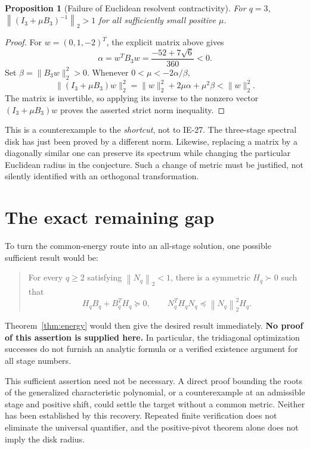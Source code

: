 \documentclass[11pt,letterpaper]{article}
\newtheorem{proposition}[theorem]{Proposition}
\theoremstyle{remark}
\newcommand{\Id}{I}
\newcommand{\norm}[1]{\left\|#1\right\|_2}
\begin{document}
\begin{proposition}[Failure of Euclidean resolvent contractivity]\label{prop:failure}
For \(q=3\), \(\norm{(\Id_3+\mu B_3)^{-1}}>1\) for all sufficiently small
positive \(\mu\).
\end{proposition}
\begin{proof}
For \(w=(0,1,-2)^T\), the explicit matrix above gives
\[
 \alpha=w^TB_3w=\frac{-52+7\sqrt6}{360}<0.
\]
Set \(\beta=\|B_3w\|_2^2>0\). Whenever \(0<\mu<-2\alpha/\beta\),
\[
 \|(\Id_3+\mu B_3)w\|_2^2
 =\|w\|_2^2+2\mu\alpha+\mu^2\beta<\|w\|_2^2.
\]
The matrix is invertible, so applying its inverse to the nonzero vector
\((\Id_3+\mu B_3)w\) proves the asserted strict norm inequality.
\end{proof}

This is a counterexample to the \emph{shortcut}, not to IE-27.
The three-stage spectral disk has just been proved by a different norm.
Likewise, replacing a matrix by a diagonally similar one can preserve its
spectrum while changing the particular Euclidean radius in the conjecture.
Such a change of metric must be justified, not silently identified with
an orthogonal transformation.

\section{The exact remaining gap}

To turn the common-energy route into an all-stage solution, one possible
sufficient result would be:
\begin{quote}
For every \(q\ge2\) satisfying \(\norm{N_q}<1\), there is a symmetric
\(H_q\succ0\) such that
\[
 H_qB_q+B_q^TH_q\succeq0,\qquad
 N_q^TH_qN_q\preceq\norm{N_q}^2H_q.
\]
\end{quote}
Theorem~\ref{thm:energy} would then give the desired result immediately.
\textbf{No proof of this assertion is supplied here.} In particular, the
tridiagonal optimization successes do not furnish an analytic formula or a
verified existence argument for all stage numbers.

This sufficient assertion need not be necessary. A direct proof bounding the
roots of the generalized characteristic polynomial, or a counterexample at an
admissible stage and positive shift, could settle the target without a common
metric. Neither has been established by this recovery. Repeated finite
verification does not eliminate the universal quantifier, and the positive-pivot
theorem alone does not imply the disk radius.
\end{document}
